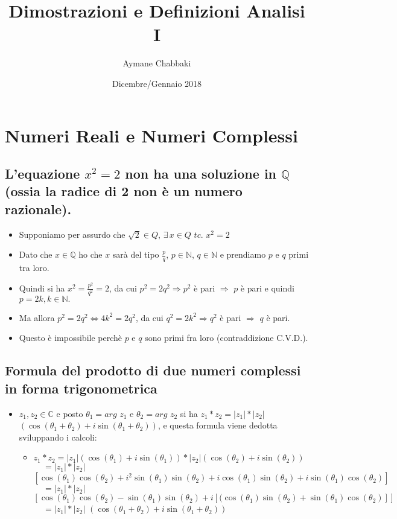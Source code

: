 \documentclass[10pt]{article}
\title{Dimostrazioni e Definizioni Analisi I}
\author{Aymane Chabbaki}
\date{Dicembre/Gennaio 2018}
\begin{document}
\maketitle
\tableofcontents
\newpage



\section{Numeri Reali e Numeri Complessi}


\subsection{L’equazione $x^2 = 2$ non ha una soluzione in $\mathbb{Q}$ (ossia la radice di 2 non
è un numero razionale).}

\begin{itemize}
\item
Supponiamo per assurdo che $\sqrt{2} \in Q$, $\exists\, x \in Q$ $ tc.$ $x^2 =2 $
\item
Dato che $x \in \mathbb{Q}$ ho che $x$ sarà del tipo $\displaystyle {\frac{p}{q}}$, $p\in \mathbb{N}$, $q\in \mathbb{N}$ e prendiamo $p$ e $q$ primi tra loro.
\item
Quindi si ha $\displaystyle {x^2 =\frac{p^2}{q^2}=2}$, da cui $p^2=2q^2\Rightarrow p^2$ è pari $\Rightarrow$ $p$ è pari e 
quindi $p=2k, k \in \mathbb{N}.$  
\item
Ma allora $p^2=2q^2\iff 4k^2=2q^2$, da cui $q^2=2k^2 \Rightarrow q^2$ è pari $\Rightarrow$ $q$ è pari.
\item
Questo è impossibile perchè $p$ e $q$ sono primi fra loro (contraddizione C.V.D.).
\end{itemize}
\medskip 
\subsection{Formula del prodotto di due numeri complessi in forma trigonometrica}
\begin{itemize}
\item
$z_1, z_2 \in \mathbb{C}$ e posto $\theta_1 = arg$ $z_1$ e $\theta_2 = arg$ $z_2$ si ha $z_1 * z_2 = |z_1| * |z_2|$ $(\cos(\theta_1 +\theta_2)+ i\sin(\theta_1 +\theta_2))$, e questa formula viene dedotta sviluppando i calcoli:
\begin{itemize}
\item
$z_1 * z_2 = |z_1| (\cos(\theta_1) + i\sin(\theta_1)) * |z_2| (\cos(\theta_2) + i\sin(\theta_2))$ \smallskip
\subitem
$ \; \; \; \; = |z_1| * |z_2|$ $[\cos(\theta_1) \cos(\theta_2)+ i^2\sin(\theta_1)\sin(\theta_2) + i\cos(\theta_1)\sin(\theta_2) + i\sin(\theta_1) \cos(\theta_2)]$\smallskip
\subitem
$ \; \; \; \; = |z_1| * |z_2|$ $[\cos(\theta_1) \cos(\theta_2)-\sin(\theta_1) \sin(\theta_2)+i[(\cos(\theta_1) \sin(\theta_2)+\sin(\theta_1) \cos(\theta_2)]]$\smallskip
\subitem
$ \; \; \; \; = |z_1| * |z_2|$ $(\cos(\theta_1 +\theta_2)+ i\sin(\theta_1 +\theta_2))$
\end{itemize}
\end{itemize}
\medskip 
\end{document}
